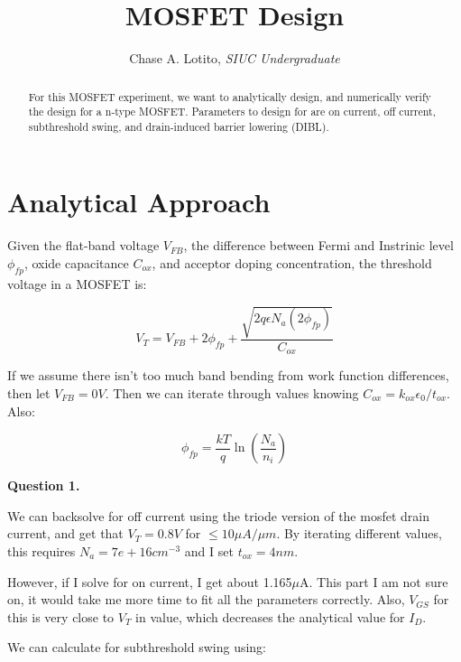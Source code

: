 \documentclass{IEEEtran}
\title{MOSFET Design}
\author{Chase A. Lotito, \textit{SIUC Undergraduate}}
\date{}
\begin{document}
\maketitle %

\begin{abstract}
    For this MOSFET experiment, we want to analytically design, and numerically verify the design for a n-type MOSFET. Parameters to design for are on current, off current, subthreshold swing, and drain-induced barrier lowering (DIBL).
\end{abstract}

\section{Analytical Approach}

Given the flat-band voltage \(V_{FB}\), the difference between Fermi and Instrinic level \(\phi_{fp}\), oxide capacitance \(C_{ox}\), and acceptor doping concentration, the threshold voltage in a MOSFET is:

\begin{equation*}
    V_T = V_{FB} + 2\phi_{fp} + \frac{\sqrt{2q\epsilon N_a (2\phi_{fp})}}{C_{ox}}
\end{equation*}

If we assume there isn't too much band bending from work function differences, then let \(V_{FB} = 0V\). Then we can iterate through values knowing \(C_{ox} = k_{ox} \epsilon_0 / t_{ox}\). Also:

\begin{equation*}
    \phi_{fp} = \frac{kT}{q} \ln \left( \frac{N_a}{n_i}  \right)
\end{equation*}

\textbf{Question 1.}

\smallskip

We can backsolve for off current using the triode version of the mosfet drain current, and get that \(V_T=0.8V\) for \(\leq 10 \mu A / \mu m\). By iterating different values, this requires \(N_a = 7e+16 cm^{-3}\) and I set \(t_{ox}=4nm\).

However, if I solve for on current, I get about 1.165\(\mu\)A. This part I am not sure on, it would take me more time to fit all the parameters correctly. Also, \(V_{GS}\) for this is very close to \(V_T\) in value, which decreases the analytical value for \(I_D\).

We can calculate for subthreshold swing using:
\end{document}
